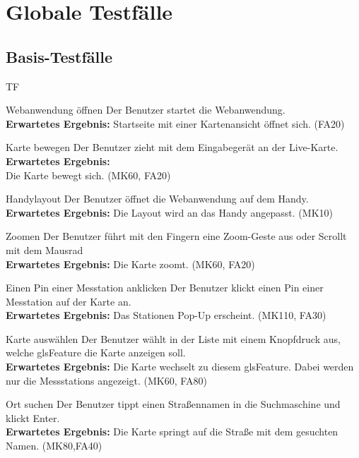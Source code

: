\section{Globale Testfälle}
\setcounter{counter}{10}
\subsection{Basis-Testfälle}
\begin{Kriterien}{TF}

	
			\item[Webanwendung öffnen] Der Benutzer startet die \gls{Webanwendung}. \\ \textbf{Erwartetes Ergebnis:} Startseite mit einer Kartenansicht öffnet sich. (FA20)

	\item[Karte bewegen] Der Benutzer zieht mit dem Eingabegerät an der \gls{Live-Karte}. \textbf{Erwartetes Ergebnis:} \\ Die Karte bewegt sich.  (MK60, FA20)
    
    \item[Handylayout] Der Benutzer öffnet die Webanwendung auf dem Handy. \\ \textbf{Erwartetes Ergebnis:} Die Layout wird an das Handy angepasst. (MK10)
	
	\item[Zoomen] Der Benutzer führt mit den Fingern eine Zoom-Geste aus oder Scrollt mit dem Mausrad \\ \textbf{Erwartetes Ergebnis:} Die Karte zoomt. (MK60, FA20)
	
	\item[Einen Pin einer Messtation anklicken] Der Benutzer klickt einen Pin einer \gls{Messtation} auf der Karte an. \\ \textbf{Erwartetes Ergebnis:} Das Stationen Pop-Up erscheint. (MK110,  FA30)
	
	\item[Karte auswählen] Der Benutzer wählt in der Liste mit einem Knopfdruck aus, welche gls{Feature} die Karte anzeigen soll. \\ \textbf{Erwartetes Ergebnis:} Die Karte wechselt zu diesem gls{Feature}. Dabei werden nur die \glspl{Messstation} angezeigt. (MK60, FA80)
	
	\item[Ort suchen] Der Benutzer tippt einen Straßennamen in die Suchmaschine und klickt Enter. \\ \textbf{Erwartetes Ergebnis:} Die Karte springt auf die Straße mit dem gesuchten Namen. (MK80,FA40)
	

\end{Kriterien}
